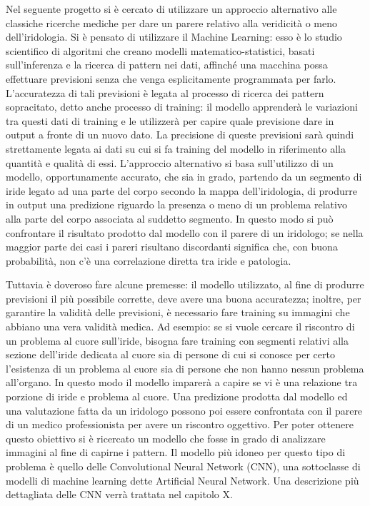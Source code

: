Nel seguente progetto si è cercato di utilizzare un approccio alternativo alle classiche ricerche mediche per dare un parere relativo alla veridicità o meno dell’iridologia. Si è pensato di utilizzare il Machine Learning: esso è lo studio scientifico di algoritmi che creano modelli matematico-statistici, basati sull’inferenza e la ricerca di pattern nei dati, affinché una macchina possa effettuare previsioni senza che venga esplicitamente programmata per farlo. L’accuratezza di tali previsioni è legata al processo di ricerca dei pattern sopracitato, detto anche processo di training: il modello apprenderà le variazioni tra questi dati di training e le utilizzerà per capire quale previsione dare in output a fronte di un nuovo dato. La precisione di queste previsioni sarà quindi strettamente legata ai dati su cui si fa training del modello in riferimento alla quantità e qualità di essi. L’approccio alternativo si basa sull’utilizzo di un modello, opportunamente accurato, che sia in grado, partendo da un segmento di iride legato ad una parte del corpo secondo la mappa dell’iridologia, di produrre in output una predizione riguardo la presenza o meno di un problema relativo alla parte del corpo associata al suddetto segmento. In questo modo si può confrontare il risultato prodotto dal modello con il parere di un iridologo; se nella maggior parte dei casi i pareri risultano discordanti significa che, con buona probabilità, non c’è una correlazione diretta tra iride e patologia. 

Tuttavia è doveroso fare alcune premesse: il modello utilizzato, al fine di produrre previsioni il più possibile corrette, deve avere una buona accuratezza; inoltre, per garantire la validità delle previsioni, è necessario fare training su immagini che abbiano una vera validità medica. Ad esempio: se si vuole cercare il riscontro di un problema al cuore sull’iride, bisogna fare training con segmenti relativi alla sezione dell’iride dedicata al cuore sia di persone di cui si conosce per certo l’esistenza di un problema al cuore sia di persone che non hanno nessun problema all’organo. In questo modo il modello imparerà a capire se vi è una relazione tra porzione di iride e problema al cuore. Una predizione prodotta dal modello ed una valutazione fatta da un iridologo possono poi essere confrontata con il parere di un medico professionista per avere un riscontro oggettivo. Per poter ottenere questo obiettivo si è ricercato un modello che fosse in grado di analizzare immagini al fine di capirne i pattern. Il modello più idoneo per questo tipo di problema è quello delle Convolutional Neural Network (CNN), una sottoclasse di modelli di machine learning dette Artificial Neural Network. Una descrizione più dettagliata delle CNN verrà trattata nel capitolo X.

